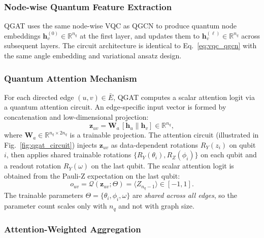 \documentclass[journal]{IEEEtran}
\begin{document}
\subsubsection{Node-wise Quantum Feature Extraction}

QGAT uses the same node-wise VQC as QGCN to produce quantum node
embeddings $\mathbf{h}_v^{(0)} \in \mathbb{R}^{n_q}$ at the first layer,
and updates them to $\mathbf{h}_v^{(\ell)} \in \mathbb{R}^{n_q}$ across
subsequent layers. The circuit architecture is identical to
Eq.~\eqref{eq:vqc_qgcn} with the same angle embedding and variational
ansatz design.

\subsubsection{Quantum Attention Mechanism}

For each directed edge $(u, v) \in \bar{E}$, QGAT computes a scalar
attention logit via a quantum attention circuit. An edge-specific input
vector is formed by concatenation and low-dimensional projection:
\begin{equation}
  \mathbf{z}_{uv} = \mathbf{W}_a\,[\mathbf{h}_u \| \mathbf{h}_v]
  \in \mathbb{R}^{n_q},
  \label{eq:edge_proj}
\end{equation}
where $\mathbf{W}_a \in \mathbb{R}^{n_q \times 2n_q}$ is a trainable
projection. The attention circuit (illustrated in Fig.~\ref{fig:qgat_circuit})
injects $\mathbf{z}_{uv}$ as data-dependent rotations $R_Y(z_i)$ on qubit
$i$, then applies shared trainable rotations $\{R_Y(\theta_i), R_Z(\phi_i)\}$
on each qubit and a readout rotation $R_Y(\omega)$ on the last qubit.
The scalar attention logit is obtained from the Pauli-Z expectation on
the last qubit:
\begin{equation}
  o_{uv} = \mathcal{Q}(\mathbf{z}_{uv}; \Theta) = \langle Z_{n_q-1}\rangle
  \in [-1, 1].
  \label{eq:qgat_logit}
\end{equation}
The trainable parameters $\Theta = \{\theta_i, \phi_i, \omega\}$ are
\textit{shared across all edges}, so the parameter count scales only with
$n_q$ and not with graph size.

\subsubsection{Attention-Weighted Aggregation}
\end{document}
